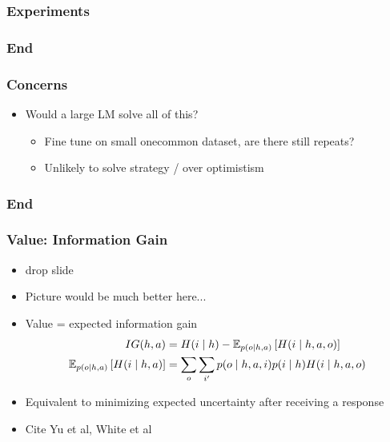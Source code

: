 \documentclass{beamer}
\begin{document}
\begin{frame}
\frametitle{Experiments}
\end{frame}

\begin{frame}
\frametitle{End}
\end{frame}


\begin{frame}
\frametitle{Concerns}
\begin{itemize}
\item Would a large LM solve all of this?
    \begin{itemize}
    \item Fine tune on small onecommon dataset, are there still repeats?
    \item Unlikely to solve strategy / over optimistism
    \end{itemize}
\end{itemize}
\end{frame}

\begin{frame}
\frametitle{End}
\end{frame}


\begin{frame}
\frametitle{Value: Information Gain}
\begin{itemize}
\item drop slide
\item Picture would be much better here...
\item Value = expected information gain
\begin{align*}
IG(h, a) &= H(i \mid h) - \mathbb{E}_{p(o\mid h,a)}\left[H(i \mid h, a, o)\right]\\
\mathbb{E}_{p(o\mid h,a)}\left[H(i \mid h, a)\right] &= \sum_o\sum_{i'}p(o\mid h,a,i)p(i\mid h)H(i \mid h,a,o)
\end{align*}
\item Equivalent to minimizing expected uncertainty after receiving a response
\item Cite Yu et al, White et al
\end{itemize}
\end{frame}
\end{document}

